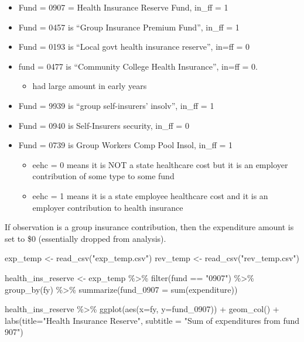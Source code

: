 \documentclass[
  letterpaper,
  DIV=11,
  numbers=noendperiod]{scrreport}
\newenvironment{Shaded}{\begin{snugshade}}{\end{snugshade}}
\newcommand{\AttributeTok}[1]{\textcolor[rgb]{0.40,0.45,0.13}{#1}}
\newcommand{\FunctionTok}[1]{\textcolor[rgb]{0.28,0.35,0.67}{#1}}
\newcommand{\NormalTok}[1]{\textcolor[rgb]{0.00,0.23,0.31}{#1}}
\newcommand{\OtherTok}[1]{\textcolor[rgb]{0.00,0.23,0.31}{#1}}
\newcommand{\SpecialCharTok}[1]{\textcolor[rgb]{0.37,0.37,0.37}{#1}}
\newcommand{\StringTok}[1]{\textcolor[rgb]{0.13,0.47,0.30}{#1}}
\providecommand{\tightlist}{%
  \setlength{\itemsep}{0pt}\setlength{\parskip}{0pt}}\usepackage{longtable,booktabs,array}
\begin{document}
\begin{itemize}
\tightlist
\item
  Fund = 0907 = Health Insurance Reserve Fund, in\_ff = 1
\item
  Fund = 0457 is ``Group Insurance Premium Fund'', in\_ff = 1
\item
  Fund = 0193 is ``Local govt health insurance reserve'', in=ff = 0
\item
  fund = 0477 is ``Community College Health Insurance'', in=ff = 0.

  \begin{itemize}
  \tightlist
  \item
    had large amount in early years
  \end{itemize}
\item
  Fund = 9939 is ``group self-insurers' insolv'', in\_ff = 1
\item
  Fund = 0940 is Self-Insurers security, in\_ff = 0
\item
  Fund = 0739 is Group Workers Comp Pool Insol, in\_ff = 1

  \begin{itemize}
  \item
    eehc = 0 means it is NOT a state healthcare cost but it is an
    employer contribution of some type to some fund
  \item
    eehc = 1 means it is a state employee healthcare cost and it is an
    employer contribution to health insurance
  \end{itemize}
\end{itemize}

If observation is a group insurance contribution, then the expenditure
amount is set to \$0 (essentially dropped from analysis).

\begin{Shaded}
\begin{Highlighting}[]
\NormalTok{exp\_temp }\OtherTok{\textless{}{-}} \FunctionTok{read\_csv}\NormalTok{(}\StringTok{"exp\_temp.csv"}\NormalTok{)}
\NormalTok{rev\_temp }\OtherTok{\textless{}{-}} \FunctionTok{read\_csv}\NormalTok{(}\StringTok{"rev\_temp.csv"}\NormalTok{)}


\NormalTok{health\_ins\_reserve }\OtherTok{\textless{}{-}}\NormalTok{ exp\_temp }\SpecialCharTok{\%\textgreater{}\%} 
  \FunctionTok{filter}\NormalTok{(fund }\SpecialCharTok{==} \StringTok{"0907"}\NormalTok{) }\SpecialCharTok{\%\textgreater{}\%}  
  \FunctionTok{group\_by}\NormalTok{(fy) }\SpecialCharTok{\%\textgreater{}\%} 
  \FunctionTok{summarize}\NormalTok{(}\AttributeTok{fund\_0907 =} \FunctionTok{sum}\NormalTok{(expenditure)) }

\NormalTok{health\_ins\_reserve }\SpecialCharTok{\%\textgreater{}\%} 
  \FunctionTok{ggplot}\NormalTok{(}\FunctionTok{aes}\NormalTok{(}\AttributeTok{x=}\NormalTok{fy, }\AttributeTok{y=}\NormalTok{fund\_0907)) }\SpecialCharTok{+} 
  \FunctionTok{geom\_col}\NormalTok{() }\SpecialCharTok{+} 
  \FunctionTok{labs}\NormalTok{(}\AttributeTok{title=}\StringTok{"Health Insurance Reserve"}\NormalTok{, }\AttributeTok{subtitle =} \StringTok{"Sum of expenditures from fund 907"}\NormalTok{)}
\end{Highlighting}
\end{Shaded}
\end{document}
